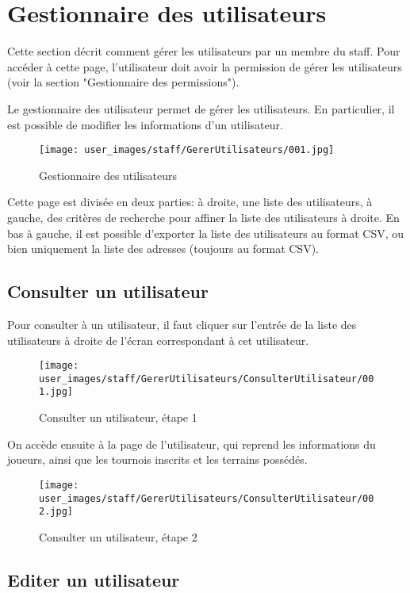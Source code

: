 \section{Gestionnaire des utilisateurs}

Cette section décrit comment gérer les utilisateurs par un membre du staff. Pour accéder à cette page, l'utilisateur doit avoir la permission de gérer les utilisateurs (voir la section "Gestionnaire des permissions").\newline

Le gestionnaire des utilisateur permet de gérer les utilisateurs. En particulier, il est possible de modifier les informations d'un utilisateur.

\begin{figure}[H]
\centering
\texttt{[image: user\_images/staff/GererUtilisateurs/001.jpg]}
\caption{Gestionnaire des utilisateurs}
\end{figure}

Cette page est divisée en deux parties: à droite, une liste des utilisateurs, à gauche, des critères de recherche pour affiner la liste des utilisateurs à droite. En bas à gauche, il est possible d'exporter la liste des utilisateurs au format CSV, ou bien uniquement la liste des adresses (toujours au format CSV).

\subsection{Consulter un utilisateur}

Pour consulter à un utilisateur, il faut cliquer sur l'entrée de la liste des utilisateurs à droite de l'écran correspondant à cet utilisateur.

\begin{figure}[H]
\centering
\texttt{[image: user\_images/staff/GererUtilisateurs/ConsulterUtilisateur/001.jpg]}
\caption{Consulter un utilisateur, étape 1}
\end{figure}

On accède ensuite à la page de l'utilisateur, qui reprend les informations du joueurs, ainsi que les tournois inscrits et les terrains possédés.

\begin{figure}[H]
\centering
\texttt{[image: user\_images/staff/GererUtilisateurs/ConsulterUtilisateur/002.jpg]}
\caption{Consulter un utilisateur, étape 2}
\end{figure}

\subsection{Editer un utilisateur}

